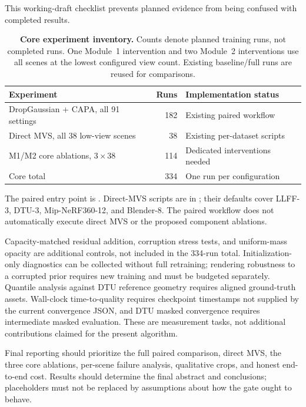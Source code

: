 \documentclass{article}
\newcommand{\ours}{CAPA}
\begin{document}
This working-draft checklist prevents planned evidence from being confused with completed results.

\begin{table}[h]
\caption{\textbf{Core experiment inventory.} Counts denote planned training runs, not completed runs. One Module~1 intervention and two Module~2 interventions use all scenes at the lowest configured view count. Existing baseline/full runs are reused for comparisons.}
\centering\small
\begin{tabular}{@{}lrl@{}}
\toprule
Experiment & Runs & Implementation status\\
\midrule
DropGaussian + \ours{}, all 91 settings & 182 & Existing paired workflow\\
Direct MVS, all 38 low-view scenes & 38 & Existing per-dataset scripts\\
M1/M2 core ablations, $3\times38$ & 114 & Dedicated interventions needed\\
\midrule
Core total & 334 & One run per configuration\\
\bottomrule
\end{tabular}
\end{table}

The paired entry point is . Direct-MVS scripts are in ; their defaults cover LLFF-3, DTU-3, Mip-NeRF360-12, and Blender-8. The paired workflow does not automatically execute direct MVS or the proposed component ablations.

Capacity-matched residual addition, corruption stress tests, and uniform-mass opacity are additional controls, not included in the 334-run total. Initialization-only diagnostics can be collected without full retraining; rendering robustness to a corrupted prior requires new training and must be budgeted separately. Quantile analysis against DTU reference geometry requires aligned ground-truth assets. Wall-clock time-to-quality requires checkpoint timestamps not supplied by the current convergence JSON, and DTU masked convergence requires intermediate masked evaluation. These are measurement tasks, not additional contributions claimed for the present algorithm.

Final reporting should prioritize the full paired comparison, direct MVS, the three core ablations, per-scene failure analysis, qualitative crops, and honest end-to-end cost. Results should determine the final abstract and conclusions; placeholders must not be replaced by assumptions about how the gate ought to behave.
\end{document}
